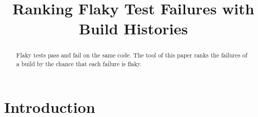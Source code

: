 \documentclass[10pt,conference]{IEEEtran}
\begin{document}
\title{Ranking Flaky Test Failures with Build Histories}
\author{}
\maketitle
\begin{abstract}
Flaky tests pass and fail on the same code. The tool of this paper ranks the failures of a build by the chance that
each failure is flaky.
\end{abstract}
\section{Introduction}
\lipsum[1-12]
\end{document}
